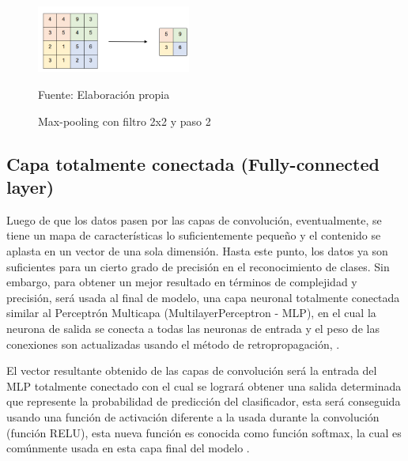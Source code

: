 		\begin{figure}[H]
		\begin{center}
		\includegraphics[width=0.45\textwidth]{images/marcoteorico/pool4}
		\end{center}
		\begin{center}
		\caption{\small{Max-pooling con filtro 2x2 y paso 2}}
		{\small{Fuente: Elaboración propia}}
		\end{center}
		\vspace{-1.5em}
		\end{figure}

	\subsection{Capa totalmente conectada (Fully-connected layer)}

		Luego de que los datos pasen por las capas de convolución, eventualmente, se tiene un mapa de características lo suficientemente pequeño y el contenido se aplasta en un vector de una sola dimensión. Hasta este punto, los datos ya son suficientes para un cierto grado de precisión en el reconocimiento de clases. Sin embargo, para obtener un mejor resultado en términos de complejidad y precisión, será usada al final de modelo, una capa neuronal totalmente conectada similar al Perceptrón Multicapa (MultilayerPerceptron - MLP), en el cual la neurona de salida se conecta a todas las neuronas de entrada y el peso de las conexiones son actualizadas usando el método de retropropagación, \citep{FCL}.

		El vector resultante obtenido de las capas de convolución será la entrada del MLP totalmente conectado con el cual se logrará obtener una salida determinada que represente la probabilidad de predicción del clasificador, esta será conseguida usando una función de activación diferente a la usada durante la convolución (función RELU), esta nueva función es conocida como función softmax, la cual es comúnmente usada en esta capa final del modelo \citep{Krizhevsky2012}.
	

